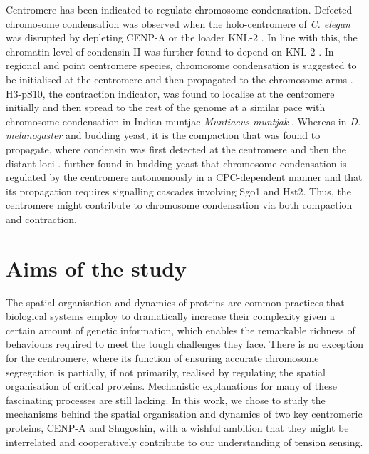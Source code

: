 Centromere has been indicated to regulate chromosome condensation. Defected chromosome condensation was observed when the holo-centromere of \textit{C. elegan} was disrupted by depleting CENP-A or the loader KNL-2 \citep{Chan2004CondensinDivisions, Maddox2006MolecularAssay, Hagstrom2002C.Meiosis, Maddox2007FunctionalChromatin}. In line with this, the chromatin level of condensin II was further found to depend on KNL-2 \citep{Wenda2021MitoticElegans}. In regional and point centromere species, chromosome condensation is suggested to be initialised at the centromere and then propagated to the chromosome arms \citep{Kruitwagen2018}. H3-pS10, the contraction indicator, was found to localise at the centromere initially and then spread to the rest of the genome at a similar pace with chromosome condensation in Indian muntjac \textit{Muntiacus muntjak} \citep{Hendzel1997Mitosis-specificCondensation}. Whereas in \textit{D. melanogaster} and budding yeast, it is the compaction that was found to propagate, where condensin was first detected at the centromere and then the distant loci \citep{Oliveira2007CondensinChromosomes, Leonard2015}. \cite{Kruitwagen2018} further found in budding yeast that chromosome condensation is regulated by the centromere autonomously in a CPC-dependent manner and that its propagation requires signalling cascades involving Sgo1 and Hst2. Thus, the centromere might contribute to chromosome condensation via both compaction and contraction. 

\section{Aims of the study}

The spatial organisation and dynamics of proteins are common practices that biological systems employ to dramatically increase their complexity given a certain amount of genetic information, which enables the remarkable richness of behaviours required to meet the tough challenges they face. There is no exception for the centromere, where its function of ensuring accurate chromosome segregation is partially, if not primarily, realised by regulating the spatial organisation of critical proteins. Mechanistic explanations for many of these fascinating processes are still lacking. In this work, we chose to study the mechanisms behind the spatial organisation and dynamics of two key centromeric proteins, CENP-A and Shugoshin, with a wishful ambition that they might be interrelated and cooperatively contribute to our understanding of tension sensing. 

